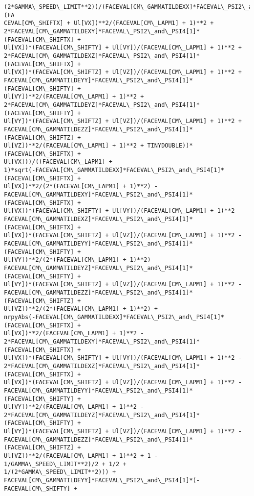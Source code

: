 \documentclass[landscape,letterpaper,10pt,english]{article}
\begin{document}
\begin{Verbatim}[commandchars=\\\{\}]
(2*GAMMA\_SPEED\_LIMIT**2))/(FACEVAL[CM\_GAMMATILDEXX]*FACEVAL\_PSI2\_and\_PSI4[1]*(FA
CEVAL[CM\_SHIFTX] + Ul[VX])**2/(FACEVAL[CM\_LAPM1] + 1)**2 +
2*FACEVAL[CM\_GAMMATILDEXY]*FACEVAL\_PSI2\_and\_PSI4[1]*(FACEVAL[CM\_SHIFTX] +
Ul[VX])*(FACEVAL[CM\_SHIFTY] + Ul[VY])/(FACEVAL[CM\_LAPM1] + 1)**2 +
2*FACEVAL[CM\_GAMMATILDEXZ]*FACEVAL\_PSI2\_and\_PSI4[1]*(FACEVAL[CM\_SHIFTX] +
Ul[VX])*(FACEVAL[CM\_SHIFTZ] + Ul[VZ])/(FACEVAL[CM\_LAPM1] + 1)**2 +
FACEVAL[CM\_GAMMATILDEYY]*FACEVAL\_PSI2\_and\_PSI4[1]*(FACEVAL[CM\_SHIFTY] +
Ul[VY])**2/(FACEVAL[CM\_LAPM1] + 1)**2 +
2*FACEVAL[CM\_GAMMATILDEYZ]*FACEVAL\_PSI2\_and\_PSI4[1]*(FACEVAL[CM\_SHIFTY] +
Ul[VY])*(FACEVAL[CM\_SHIFTZ] + Ul[VZ])/(FACEVAL[CM\_LAPM1] + 1)**2 +
FACEVAL[CM\_GAMMATILDEZZ]*FACEVAL\_PSI2\_and\_PSI4[1]*(FACEVAL[CM\_SHIFTZ] +
Ul[VZ])**2/(FACEVAL[CM\_LAPM1] + 1)**2 + TINYDOUBLE))*(FACEVAL[CM\_SHIFTX] +
Ul[VX]))/((FACEVAL[CM\_LAPM1] +
1)*sqrt(-FACEVAL[CM\_GAMMATILDEXX]*FACEVAL\_PSI2\_and\_PSI4[1]*(FACEVAL[CM\_SHIFTX] +
Ul[VX])**2/(2*(FACEVAL[CM\_LAPM1] + 1)**2) -
FACEVAL[CM\_GAMMATILDEXY]*FACEVAL\_PSI2\_and\_PSI4[1]*(FACEVAL[CM\_SHIFTX] +
Ul[VX])*(FACEVAL[CM\_SHIFTY] + Ul[VY])/(FACEVAL[CM\_LAPM1] + 1)**2 -
FACEVAL[CM\_GAMMATILDEXZ]*FACEVAL\_PSI2\_and\_PSI4[1]*(FACEVAL[CM\_SHIFTX] +
Ul[VX])*(FACEVAL[CM\_SHIFTZ] + Ul[VZ])/(FACEVAL[CM\_LAPM1] + 1)**2 -
FACEVAL[CM\_GAMMATILDEYY]*FACEVAL\_PSI2\_and\_PSI4[1]*(FACEVAL[CM\_SHIFTY] +
Ul[VY])**2/(2*(FACEVAL[CM\_LAPM1] + 1)**2) -
FACEVAL[CM\_GAMMATILDEYZ]*FACEVAL\_PSI2\_and\_PSI4[1]*(FACEVAL[CM\_SHIFTY] +
Ul[VY])*(FACEVAL[CM\_SHIFTZ] + Ul[VZ])/(FACEVAL[CM\_LAPM1] + 1)**2 -
FACEVAL[CM\_GAMMATILDEZZ]*FACEVAL\_PSI2\_and\_PSI4[1]*(FACEVAL[CM\_SHIFTZ] +
Ul[VZ])**2/(2*(FACEVAL[CM\_LAPM1] + 1)**2) +
nrpyAbs(-FACEVAL[CM\_GAMMATILDEXX]*FACEVAL\_PSI2\_and\_PSI4[1]*(FACEVAL[CM\_SHIFTX] +
Ul[VX])**2/(FACEVAL[CM\_LAPM1] + 1)**2 -
2*FACEVAL[CM\_GAMMATILDEXY]*FACEVAL\_PSI2\_and\_PSI4[1]*(FACEVAL[CM\_SHIFTX] +
Ul[VX])*(FACEVAL[CM\_SHIFTY] + Ul[VY])/(FACEVAL[CM\_LAPM1] + 1)**2 -
2*FACEVAL[CM\_GAMMATILDEXZ]*FACEVAL\_PSI2\_and\_PSI4[1]*(FACEVAL[CM\_SHIFTX] +
Ul[VX])*(FACEVAL[CM\_SHIFTZ] + Ul[VZ])/(FACEVAL[CM\_LAPM1] + 1)**2 -
FACEVAL[CM\_GAMMATILDEYY]*FACEVAL\_PSI2\_and\_PSI4[1]*(FACEVAL[CM\_SHIFTY] +
Ul[VY])**2/(FACEVAL[CM\_LAPM1] + 1)**2 -
2*FACEVAL[CM\_GAMMATILDEYZ]*FACEVAL\_PSI2\_and\_PSI4[1]*(FACEVAL[CM\_SHIFTY] +
Ul[VY])*(FACEVAL[CM\_SHIFTZ] + Ul[VZ])/(FACEVAL[CM\_LAPM1] + 1)**2 -
FACEVAL[CM\_GAMMATILDEZZ]*FACEVAL\_PSI2\_and\_PSI4[1]*(FACEVAL[CM\_SHIFTZ] +
Ul[VZ])**2/(FACEVAL[CM\_LAPM1] + 1)**2 + 1 - 1/GAMMA\_SPEED\_LIMIT**2)/2 + 1/2 +
1/(2*GAMMA\_SPEED\_LIMIT**2))) +
FACEVAL[CM\_GAMMATILDEYY]*FACEVAL\_PSI2\_and\_PSI4[1]*(-FACEVAL[CM\_SHIFTY] +

\end{Verbatim}
\end{document}
